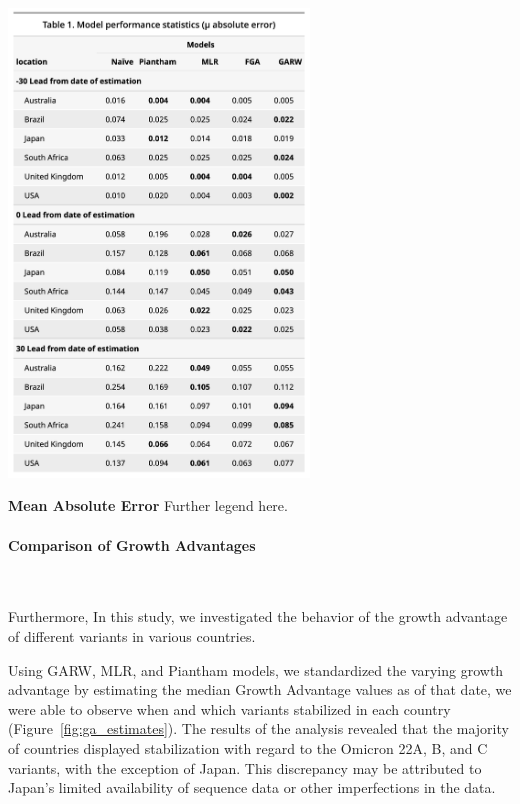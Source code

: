 \documentclass[11pt,oneside,letterpaper]{article}
\begin{document}
\begin{table}[H]
	\centering
	\includegraphics[width=0.6\textwidth]{figures/model_comp_table.png}
	\caption{\textbf{Mean Absolute Error}
	Further legend here.
	}
	\label{table:model_comp_table}
\end{table}

\paragraph{Comparison of Growth Advantages}\

Furthermore, In this study, we investigated the behavior of the growth advantage of different variants in various countries.

Using GARW, MLR, and Piantham models, we standardized the varying growth advantage by estimating the median Growth Advantage values as of that date, we were able to observe when and which variants stabilized in each country (Figure~\ref{fig:ga_estimates}). 
The results of the analysis revealed that the majority of countries displayed stabilization with regard to the Omicron 22A, B, and C variants, with the exception of Japan.
This discrepancy may be attributed to Japan's limited availability of sequence data or other imperfections in the data.
\end{document}
